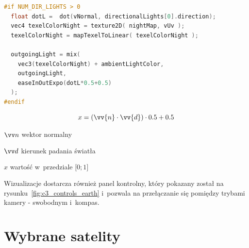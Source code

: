\begin{lstlisting}[float=h, language=C++, label={lst:earthFrag}, caption={
  Modyfikacja fragment shadera materiału \texttt{MeshPhongMaterial}}
]
#if NUM_DIR_LIGHTS > 0
  float dotL =  dot(vNormal, directionalLights[0].direction);
  vec4 texelColorNight = texture2D( nightMap, vUv );
  texelColorNight = mapTexelToLinear( texelColorNight );

  outgoingLight = mix(
    vec3(texelColorNight) + ambientLightColor,
    outgoingLight,
    easeInOutExpo(dotL*0.5+0.5)
  );
#endif
\end{lstlisting}
\begin{equation}
  \label{eq:earth_dot}
  x = (\vv{n} \cdot \vv{d}) \cdot 0.5 + 0.5
\end{equation}
\begin{eqexpl}[25mm]
\item {$\vv n$} wektor normalny
\item {$\vv d$} kierunek padania światła
\item {$x$} wartość w~przedziale $\lbrack0; 1\rbrack$
\end{eqexpl}
\vspace{\baselineskip}

Wizualizacje dostarcza również panel kontrolny, który pokazany został na rysunku~\ref{fig:c3_controls_earth} i~pozwala na przełączanie się pomiędzy trybami kamery - swobodnym i~kompas.

\section{Wybrane satelity}

